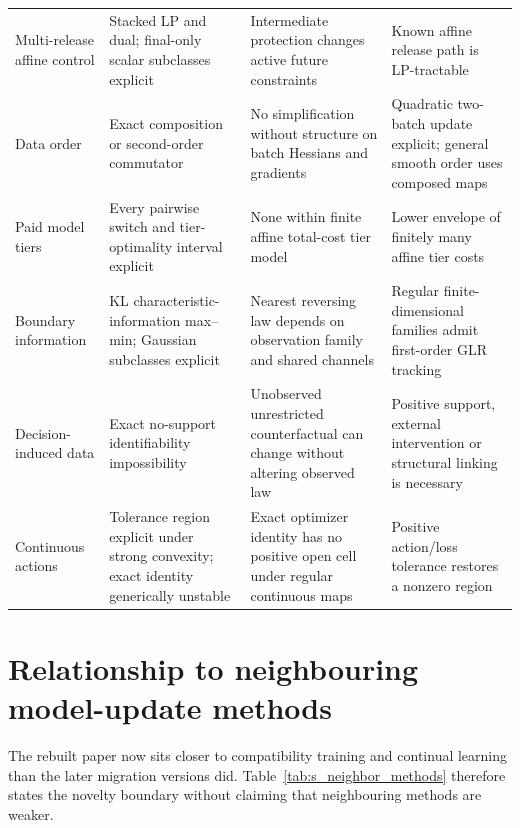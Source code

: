 \documentclass[11pt,letterpaper]{article}
\theoremstyle{plain}
\newcommand{\1}{\mathbf 1}
\begin{document}
\begin{longtable}{p{}p{}p{}p{}}
Multi-release affine control & Stacked LP and dual; final-only scalar subclasses explicit & Intermediate protection changes active future constraints & Known affine release path is LP-tractable\\
Data order & Exact composition or second-order commutator & No simplification without structure on batch Hessians and gradients & Quadratic two-batch update explicit; general smooth order uses composed maps\\
Paid model tiers & Every pairwise switch and tier-optimality interval explicit & None within finite affine total-cost tier model & Lower envelope of finitely many affine tier costs\\
Boundary information & KL characteristic-information max--min; Gaussian subclasses explicit & Nearest reversing law depends on observation family and shared channels & Regular finite-dimensional families admit first-order GLR tracking\\
Decision-induced data & Exact no-support identifiability impossibility & Unobserved unrestricted counterfactual can change without altering observed law & Positive support, external intervention or structural linking is necessary\\
Continuous actions & Tolerance region explicit under strong convexity; exact identity generically unstable & Exact optimizer identity has no positive open cell under regular continuous maps & Positive action/loss tolerance restores a nonzero region\\
\bottomrule
\end{longtable}
\endgroup

\section{Relationship to neighbouring model-update methods}
The rebuilt paper now sits closer to compatibility training and continual learning than the later migration versions did. Table~\ref{tab:s_neighbor_methods} therefore states the novelty boundary without claiming that neighbouring methods are weaker.
\end{document}
